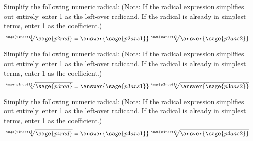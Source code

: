 \documentclass{ximera}
\begin{document}
\begin{problem}
    Simplify the following numeric radical: (Note: If the radical expression simplifies out entirely, enter 1 as the left-over radicand. If the radical is already in simplest terms, enter 1 as the coefficient.)
    \[
        \sqrt[\sage{p2root1}]{\sage{p2rad}} = \answer{\sage{p2ans1}}\sqrt[\sage{p2root1}]{\answer{\sage{p2ans2}}}
    \]
\end{problem}


\begin{problem}
    Simplify the following numeric radical: (Note: If the radical expression simplifies out entirely, enter 1 as the left-over radicand. If the radical is already in simplest terms, enter 1 as the coefficient.)
    \[
        \sqrt[\sage{p3root1}]{\sage{p3rad}} = \answer{\sage{p3ans1}}\sqrt[\sage{p3root1}]{\answer{\sage{p3ans2}}}
    \]
\end{problem}


\begin{problem}
    Simplify the following numeric radical: (Note: If the radical expression simplifies out entirely, enter 1 as the left-over radicand. If the radical is already in simplest terms, enter 1 as the coefficient.)
    \[
        \sqrt[\sage{p4root1}]{\sage{p4rad}} = \answer{\sage{p4ans1}}\sqrt[\sage{p4root1}]{\answer{\sage{p4ans2}}}
    \]
\end{problem}
\end{document}
